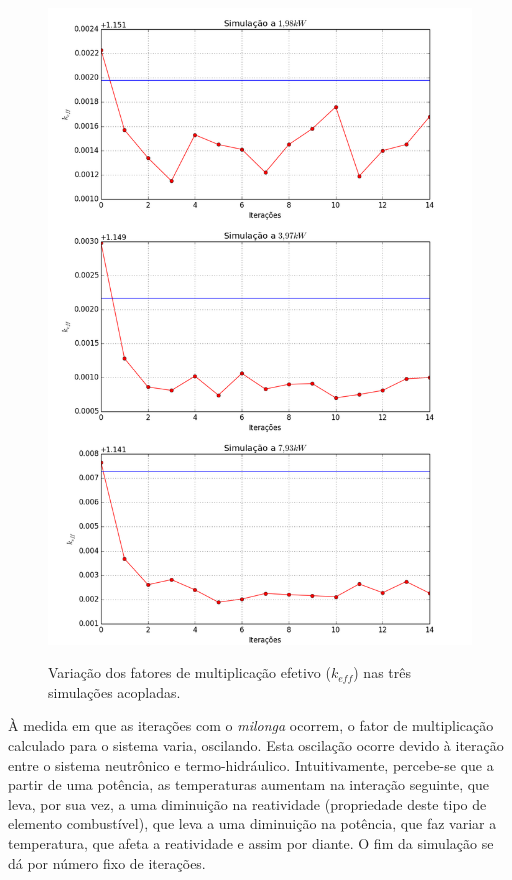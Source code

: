 \begin{figure}[htb]
  \caption{Variação dos fatores de multiplicação efetivo ($k_{eff}$) nas três simulações acopladas.}
  \centering\includegraphics[scale=0.5]{figuras/plot-vertical.png}
  \label{fig:keff_all}
\end{figure}

À medida em que as iterações com o \textit{milonga} ocorrem, o fator de multiplicação
calculado para o sistema varia, oscilando. Esta oscilação ocorre devido à iteração
entre o sistema neutrônico e termo-hidráulico. Intuitivamente, percebe-se que a partir
de uma potência, as temperaturas aumentam na interação seguinte, que leva, por sua vez,
a uma diminuição na reatividade (propriedade deste tipo de elemento combustível),
que leva a uma diminuição na potência, que faz variar a temperatura, que afeta
a reatividade e assim por diante. O fim da simulação se dá por número fixo
de iterações.

